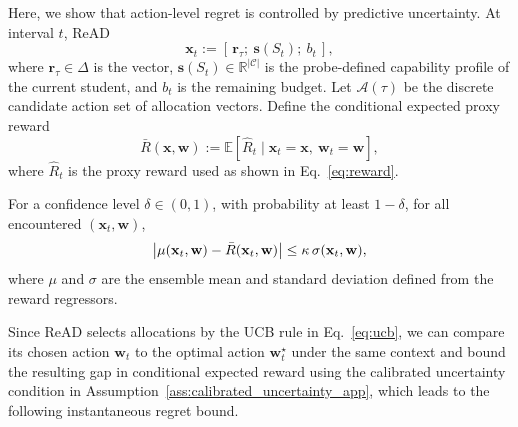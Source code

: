Here, we show that action-level regret is controlled by predictive uncertainty. At interval $t$, ReAD 
\begin{equation}
\mathbf{x}_t := [\,\mathbf{r}_\tau;\ \mathbf{s}(S_{t});\ b_t\,],
\label{eq:context_short}
\end{equation}
where $\mathbf{r}_\tau\in\Delta$ is the  vector, $\mathbf{s}(S_{t})\in\mathbb{R}^{|\mathcal{C}|}$ is the probe-defined capability profile of the current student, and $b_t$ is the remaining budget. Let $\mathcal{A}(\tau)$ be the discrete candidate action set of allocation vectors. Define the conditional expected proxy reward
\begin{equation}
\bar R(\mathbf{x},\mathbf{w}) := \mathbb{E}\!\left[\widehat{R}_t\mid \mathbf{x}_t=\mathbf{x},\ \mathbf{w}_t=\mathbf{w}\right],
\label{eq:expected_reward_short}
\end{equation}
where $\widehat{R}_t$ is the proxy reward used as shown in Eq.~\eqref{eq:reward}.

\begin{assumption}\label{ass:calibrated_uncertainty_app}
    For a confidence level $\delta\in(0,1)$, with probability at least $1-\delta$, for all encountered $(\mathbf{x}_t,\mathbf{w})$,
\begin{equation}
\big|\mu(\mathbf{x}_t,\mathbf{w})-\bar R(\mathbf{x}_t,\mathbf{w})\big| \le \kappa\,\sigma(\mathbf{x}_t,\mathbf{w}),
\label{eq:calibration_short}
\end{equation}
where $\mu$ and $\sigma$ are the ensemble mean and standard deviation defined from the reward regressors.
\end{assumption}

Since ReAD selects allocations by the UCB rule in Eq.~\eqref{eq:ucb}, we can compare its chosen action $\mathbf{w}_t$ to the optimal action $\mathbf{w}_t^\star$ under the same context and bound the resulting gap in conditional expected reward using the calibrated uncertainty condition in Assumption~\ref{ass:calibrated_uncertainty_app}, which leads to the following instantaneous regret bound.

